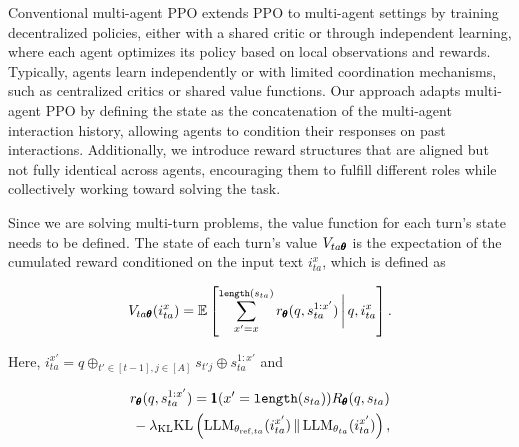 Conventional multi-agent PPO extends PPO to multi-agent settings by training decentralized policies, either with a shared critic or through independent learning, where each agent optimizes its policy based on local observations and rewards. Typically, agents learn independently or with limited coordination mechanisms, such as centralized critics or shared value functions. Our approach adapts multi-agent PPO by defining the state as the concatenation of the multi-agent interaction history, allowing agents to condition their responses on past interactions. Additionally, we introduce reward structures that are aligned but not fully identical across agents, encouraging them to fulfill different roles while collectively working toward solving the task.

Since we are solving multi-turn problems, the value function for each turn's state {needs to be defined}. The state of each turn's  value $V_{ta\pmb{\theta}}$ is the expectation of the cumulated reward  conditioned on the input text $i_{ta}^x$, which is defined as 

\safevspace{-6mm}
{\small
\begin{align*}
    V_{ta\pmb{\theta}}(i_{ta}^x) = \mathbb{E} \left[\sum_{x' = x}^{\texttt{length}(s_{ta})} r_{\pmb{\theta}} (q, s_{ta}^{1:x'}) {\,\bigg|\,} q, i_{ta}^{x} \right].
\end{align*}}
\safevspace{-5mm}

\noindent Here, \( i_{ta}^{x'} = q \oplus_{t' \in [t-1], j \in [A]} s_{t'j} \oplus s^{1:{x'}}_{ta} \) and 

\safevspace{-4mm}

{
\small
\begin{align*}
    &r_{\pmb{\theta}}(q, s_{ta}^{1:x'}) = \pmb{1}(x' = \texttt{length}(s_{ta})) R_{\pmb{\theta}}(q, s_{ta}) 
\\
&\, -\lambda_{\text{KL}} \text{KL}\left(\text{LLM}_{\theta_{\text{ref},ta}}(i_{ta}^{x'}) \,\|\, \text{LLM}_{\theta_{ta}}(i_{ta}^{x'})\right), 
\end{align*}
}

\safevspace{-4mm}


